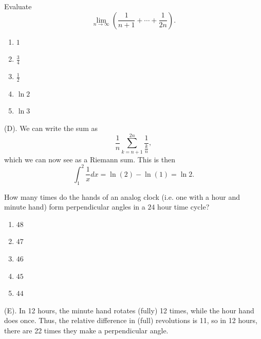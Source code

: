 \begin{exercise}
Evaluate
\[
\lim_{n\to\infty}
\left(
\frac{1}{n+1}
+\cdots+
\frac{1}{2n}
\right).
\]
\begin{enumerate}[label=(\Alph*)]
    \item $1$
    \item $\frac{3}{4}$
    \item $\frac{1}{2}$
    \item $\ln 2$
    \item $\ln 3$
\end{enumerate}
\end{exercise}
\begin{solution}
(D). We can write the sum as 
\[
\frac{1}{n} \sum_{k = n + 1}^{2n} \frac{1}{\frac{k}{n}},
\]
which we can now see as a Riemann sum. This is then 
\[
\int_1^2 \frac{1}{x} dx = \ln (2) - \ln (1) = \ln 2.
\]
\end{solution}


\begin{exercise}
How many times do the hands of an analog clock (i.e. one with 
a hour and minute hand) form perpendicular angles in a $24$ hour time cycle?
\begin{enumerate}[label=(\Alph*)]
    \item $48$
    \item $47$
    \item $46$
    \item $45$
    \item $44$
\end{enumerate}
\end{exercise}
\begin{solution}
(E). In 12 hours, the minute hand rotates (fully) 12 times, while the hour hand does once. 
Thus, the relative difference in (full) revolutions is 11, so in 12 hours, there are 
22 times they make a perpendicular angle. 
\end{solution}

